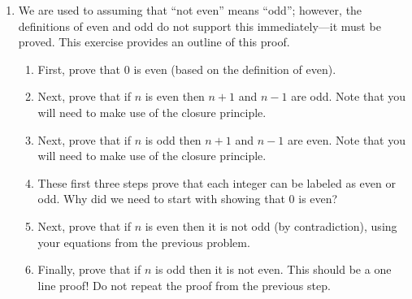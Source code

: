 \documentclass[letterpaper,12pt,fleqn]{article}
\begin{document}
\begin{enumerate}[left=0in,itemsep=0.5in]
\item We are used to assuming that ``not even'' means ``odd''; however, the definitions of even and odd do not
  support this immediately---it must be proved.  This exercise provides an outline of this proof.
  \begin{enumerate}
  \item First, prove that \(0\) is even (based on the definition of even).
  \item Next, prove that if \(n\) is even then \(n+1\) and \(n-1\) are odd.  Note that you will need to make use of
    the closure principle.
  \item Next, prove that if \(n\) is odd then \(n+1\) and \(n-1\) are even.  Note that you will need to make use of
    the closure principle.
  \item These first three steps prove that each integer can be labeled as even or odd.  Why did we need to start
    with showing that \(0\) is even?
  \item Next, prove that if \(n\) is even then it is not odd (by contradiction), using your equations from the
    previous problem.
  \item Finally, prove that if \(n\) is odd then it is not even.  This should be a one line proof!  Do not repeat
    the proof from the previous step.
  \end{enumerate}
\end{enumerate}
\end{document}
